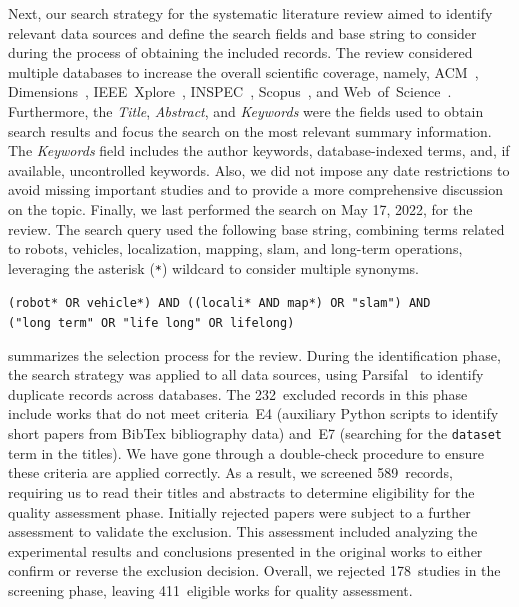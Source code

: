

Next, our search strategy for the systematic literature review aimed
to identify relevant data sources and define the search fields and base string
to consider during the process of obtaining the included records.
The review considered multiple databases to increase the overall scientific
coverage, namely, ACM~\cite{acm}, Dimensions~\cite{dimensions},
IEEE~Xplore~\cite{ieeexplore}, INSPEC~\cite{inspec},
Scopus~\cite{scopus}, and Web~of~Science~\cite{wos}.
Furthermore, the \textit{Title}, \textit{Abstract}, and \textit{Keywords}
were the fields used to obtain search results and focus the search on the most
relevant summary information. The \textit{Keywords} field includes the author
keywords, database-indexed terms, and, if available, uncontrolled keywords.
Also, we did not impose any date restrictions to avoid missing important studies
and to provide a more comprehensive discussion on the topic.
Finally, we last performed the search on May 17, 2022, for the review.
The search query used the following base string, combining terms related to
robots, vehicles, localization, mapping, \gls{slam}, and long-term operations,
leveraging the asterisk (\texttt{*}) wildcard to consider multiple synonyms.

{\centering
\texttt{(robot* OR vehicle*) AND ((locali* AND map*) OR "slam") AND}\\
\texttt{("long term" OR "life long" OR lifelong)}
\par}

 summarizes
the selection process for the review. During the identification phase,
the search strategy was applied to all data sources,
using Parsifal~\cite{parsifal} to identify duplicate records across databases.
The 232~excluded records in this phase include works that do not meet
criteria~E4 (auxiliary Python scripts to identify short papers from BibTex
bibliography data) and~E7 (searching for the \texttt{dataset} term in the
titles). We have gone through a double-check procedure to ensure
these criteria are applied correctly. As a result, we screened 589~records,
requiring us to read their titles and abstracts to determine
eligibility for the quality assessment phase.
Initially rejected papers were subject to a further assessment
to validate the exclusion. This assessment included analyzing
the experimental results and conclusions presented in the original works
to either confirm or reverse the exclusion decision.
Overall, we rejected 178~studies in the screening phase,
leaving 411~eligible works for quality assessment.

